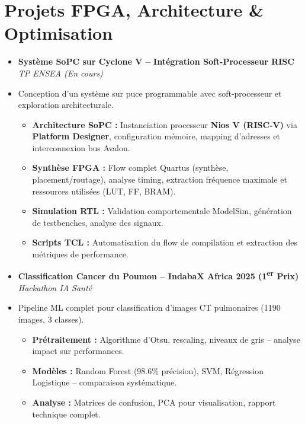 \documentclass[a4paper,11pt]{article}
\begin{document}
\section{Projets FPGA, Architecture \& Optimisation}
\begin{itemize}[leftmargin=*, label={}]

\item \textbf{Système SoPC sur Cyclone V -- Intégration Soft-Processeur RISC} \hfill \textit{TP ENSEA (En cours)}
\vspace{-2pt}
\item \small{Conception d'un système sur puce programmable avec soft-processeur et exploration architecturale.}
    \begin{itemize}[leftmargin=0.4cm, nosep, label=\tiny$\bullet$]
        \item \small{\textbf{Architecture SoPC :} Instanciation processeur \textbf{Nios V (RISC-V)} via \textbf{Platform Designer}, configuration mémoire, mapping d'adresses et interconnexion bus Avalon.}
        \item \small{\textbf{Synthèse FPGA :} Flow complet Quartus (synthèse, placement/routage), analyse timing, extraction fréquence maximale et ressources utilisées (LUT, FF, BRAM).}
        \item \small{\textbf{Simulation RTL :} Validation comportementale ModelSim, génération de testbenches, analyse des signaux.}
        \item \small{\textbf{Scripts TCL :} Automatisation du flow de compilation et extraction des métriques de performance.}
    \end{itemize}
    \vspace{3pt}

\item \textbf{Classification Cancer du Poumon -- IndabaX Africa 2025 (1\textsuperscript{er} Prix)} \hfill \textit{Hackathon IA Santé}
\vspace{-2pt}
\item \small{Pipeline ML complet pour classification d'images CT pulmonaires (1190 images, 3 classes).}
    \begin{itemize}[leftmargin=0.4cm, nosep, label=\tiny$\bullet$]
        \item \small{\textbf{Prétraitement :} Algorithme d'Otsu, rescaling, niveaux de gris -- analyse impact sur performances.}
        \item \small{\textbf{Modèles :} Random Forest (98.6\% précision), SVM, Régression Logistique -- comparaison systématique.}
        \item \small{\textbf{Analyse :} Matrices de confusion, PCA pour visualisation, rapport technique complet.}
    \end{itemize}
    \vspace{3pt}


\end{itemize}
\end{document}
